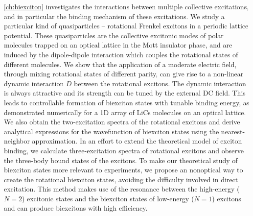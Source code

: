 \autoref{ch:biexciton} investigates the interactions between multiple collective excitations, and
in particular the binding mechanism of these excitations. 
We study a particular kind of quasiparticles -- rotational Frenkel excitons in a 
periodic lattice potential. These quasiparticles are the collective excitonic modes of polar molecules 
trapped on an optical lattice in the Mott insulator phase, and are induced by the dipole-dipole interaction which couples the 
rotational states of different molecules. 
We show that the application of a moderate electric field,  through mixing rotational states of different parity, can give 
rise to a non-linear dynamic interaction $D$ between the rotational excitons. The dynamic interaction is always attractive and its 
strength can be tuned by the external DC field. This leads to controllable formation of biexciton states with tunable binding
energy, as demonstrated numerically for a 1D array of LiCs molecules on an optical lattice. We also obtain the 
two-excitation spectra of the rotational excitons and derive analytical expressions for the wavefunction of biexciton states 
using the nearest-neighbor approximation. In an effort to extend the theoretical model of exciton binding, we calculate 
three-excitation spectra of rotational excitons and observe the three-body bound states of the excitons.
To make our theoretical study of biexciton states more relevant to experiments, we propose an nonoptical way to create the rotational biexciton states, avoiding the difficulty involved in 
direct excitation. This method makes use of the resonance between the high-energy ($N=2$) excitonic states 
and the biexciton states of low-energy ($N=1$) excitons and can produce biexcitons with high efficiency. 

